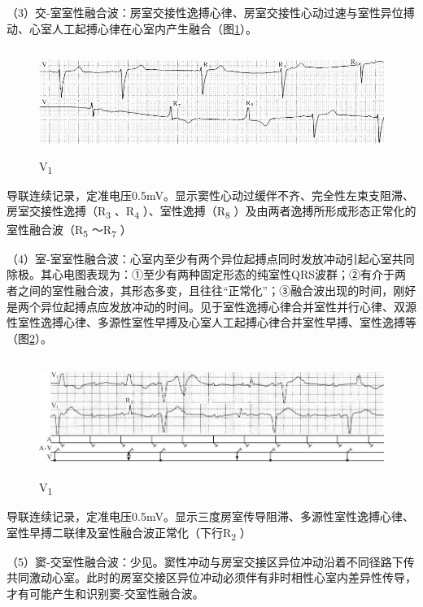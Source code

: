 （3）交-室室性融合波：房室交接性逸搏心律、房室交接性心动过速与室性异位搏动、心室人工起搏心律在心室内产生融合（图\ref{fig3-18}）。

\begin{figure}[!htbp]
 \centering
 \includegraphics[width=5.58333in,height=1.36458in]{./images/Image00068.jpg}
 \captionsetup{justification=centering}
 \caption{V\textsubscript{1}}
 \label{fig3-18}
  \end{figure} 
导联连续记录，定准电压0.5mV。显示窦性心动过缓伴不齐、完全性左束支阻滞、房室交接性逸搏（R\textsubscript{3}
、R\textsubscript{4} ）、室性逸搏（R\textsubscript{8}
）及由两者逸搏所形成形态正常化的室性融合波（R\textsubscript{5}
～R\textsubscript{7} ）

（4）室-室室性融合波：心室内至少有两个异位起搏点同时发放冲动引起心室共同除极。其心电图表现为：①至少有两种固定形态的纯室性QRS波群；②有介于两者之间的室性融合波，其形态多变，且往往“正常化”；③融合波出现的时间，刚好是两个异位起搏点应发放冲动的时间。见于室性逸搏心律合并室性并行心律、双源性室性逸搏心律、多源性室性早搏及心室人工起搏心律合并室性早搏、室性逸搏等（图\ref{fig3-19}）。

\begin{figure}[!htbp]
 \centering
 \includegraphics[width=5.78125in,height=1.51042in]{./images/Image00069.jpg}
 \captionsetup{justification=centering}
 \caption{V\textsubscript{1}}
 \label{fig3-19}
  \end{figure} 
导联连续记录，定准电压0.5mV。显示三度房室传导阻滞、多源性室性逸搏心律、室性早搏二联律及室性融合波正常化（下行R\textsubscript{2}
）

（5）窦-交室性融合波：少见。窦性冲动与房室交接区异位冲动沿着不同径路下传共同激动心室。此时的房室交接区异位冲动必须伴有非时相性心室内差异性传导，才有可能产生和识别窦-交室性融合波。

